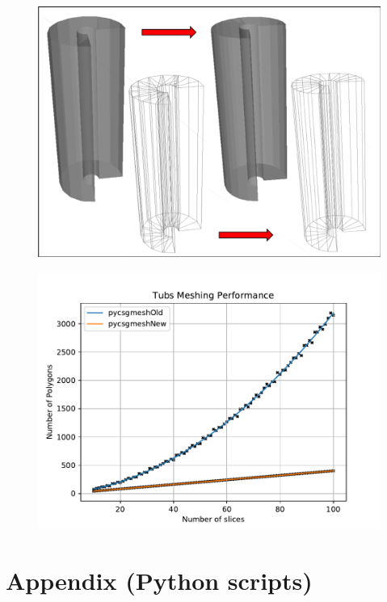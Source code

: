 \documentclass[12pt,a4paper]{article}
\begin{document}
\begin{figure}[h!]
\centering
\begin{minipage}{.2\textwidth}
  \centering
  \includegraphics[height=0.7\linewidth]{Images//Meshes//tubs.png}
  \label{fig:test1}
\end{minipage}%
\begin{minipage}{.3\textwidth}
  \centering
  \includegraphics[scale=0.35]{Images//Quad_fits//Tubs_quad.pdf}
  \label{fig:test2}
\end{minipage}%
\end{figure}

\endgroup
\onecolumn


\section{Appendix (Python scripts)}
\end{document}
